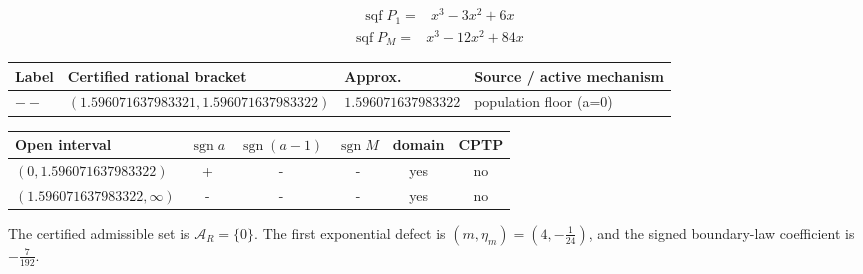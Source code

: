 \[\begin{aligned}
\operatorname{sqf}P_1={}&x^{3}-3 x^{2}+6 x
\end{aligned}\]
\[\begin{aligned}
\operatorname{sqf}P_M={}&x^{3}-12 x^{2}+84 x
\end{aligned}\]
\begin{center}
\begin{tabularx}{\textwidth}{@{}l l l X@{}}
\toprule
Label & Certified rational bracket & Approx. & Source / active mechanism \\
\midrule
$--$ & $(1.596071637983321,1.596071637983322)$ & $1.596071637983322$ & population floor (a=0) \\
\bottomrule
\end{tabularx}
\end{center}
\begin{center}
\begin{tabular}{@{}l c c c c c@{}}
\toprule
Open interval & $\operatorname{sgn}a$ & $\operatorname{sgn}(a-1)$ & $\operatorname{sgn}M$ & domain & CPTP \\
\midrule
$(0,1.596071637983322)$ & + & - & - & yes & no \\
$(1.596071637983322,\infty)$ & - & - & - & yes & no \\
\bottomrule
\end{tabular}
\end{center}
The certified admissible set is $\mathcal A_R=\{0\}$. The first exponential defect is $(m,\eta_m)=(4,- \frac{1}{24})$, and the signed boundary-law coefficient is $- \frac{7}{192}$.
